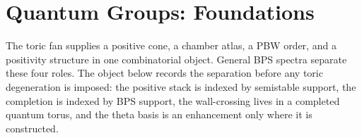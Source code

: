 \chapter{Quantum Groups: Foundations}
\label{ch:quantum-groups}

\providecommand{\Meff}{\mathcal{M}^{\mathfrak A}_{\sigma,S}}
\providecommand{\PBPS}{\mathfrak{P}^{\mathrm{BPS}}}
\providecommand{\Gammaeff}{\Gamma^{+}_{\sigma,S,o}}
\providecommand{\Gammass}{\Gamma^{\mathrm{ss}}_{\sigma,S}}
\providecommand{\GammaBPS}{\Gamma^{\mathrm{BPS}}_{\sigma,S,o}}
\providecommand{\Teq}{T_{\mathrm{eq}}}
\providecommand{\DKS}{\mathfrak{D}^{\mathrm{KS}}_{\sigma,S,o}}
\providecommand{\ThetaBPS}{\Theta^{\mathrm{BPS}}_{\sigma,S,o,\Teq}}

The toric fan supplies a positive cone, a chamber atlas, a PBW order,
and a positivity structure in one combinatorial object. General BPS
spectra separate these four roles. The object below records the
separation before any toric degeneration is imposed: the positive stack
is indexed by semistable support, the completion is indexed by BPS
support, the wall-crossing lives in a completed quantum torus, and the
theta basis is an enhancement only where it is constructed.

